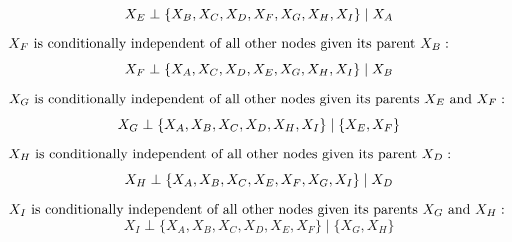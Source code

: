\documentclass[a3paper,12pt]{extarticle} %
\begin{document}
\begin{enumerate}
\begin{enumerate}
    \)
    \[
        X_E \perp \{ X_B, X_C, X_D,  X_F, X_G, X_H, X_I\} \mid X_A \\
    \]
    \(
        X_F \text{ is conditionally independent of all other nodes given its parent } X_B: \\
    \)
    \[
        X_F \perp \{X_A, X_C, X_D, X_E, X_G, X_H, X_I\} \mid X_B \\
    \]
    \(
        X_G \text{ is conditionally independent of all other nodes given its parents } X_E \text{ and } X_F: \\
    \)
    \[
        X_G \perp \{X_A, X_B, X_C, X_D, X_H, X_I\} \mid \{X_E, X_F\} \\
    \]
    \(
        X_H \text{ is conditionally independent of all other nodes given its parent } X_D: \\
    \)
    \[
        X_H \perp \{X_A, X_B, X_C, X_E, X_F, X_G, X_I\} \mid X_D \\
    \]
    \(
        X_I \text{ is conditionally independent of all other nodes given its parents } X_G \text{ and } X_H: \\
    \)
    \[
        X_I \perp \{X_A, X_B, X_C, X_D, X_E, X_F\} \mid \{X_G, X_H\}
    \]
\end{enumerate}


\end{enumerate}
\end{document}
